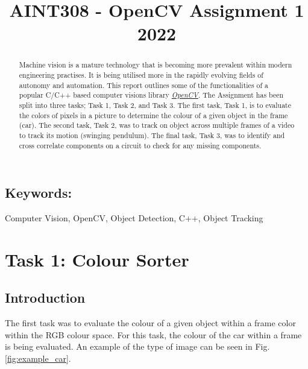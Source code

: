 \documentclass[conference]{IEEEtran}
\begin{document}
\title{AINT308 - OpenCV Assignment 1 2022}

\author{
}

\maketitle

\begin{abstract}

Machine vision is a mature technology that is becoming more prevalent within modern engineering practises. It is being utilised more in the rapidly evolving fields of autonomy and automation. This report outlines some of the functionalities of a popular C/C++ based computer visions library \href{https://opencv.org}{\textit{OpenCV}}. The Assignment has been split into three tasks; Task 1, Task 2, and Task 3. The first task, Task 1, is to evaluate the colors of pixels in a picture to determine the colour of a given object in the frame (car). The second task, Task 2, was to track on object across multiple frames of a video to track its motion (swinging pendulum). The final task, Task 3, was to identify and cross correlate components on a circuit to check for any missing components.

\end{abstract}

\subsection*{Keywords:} 
Computer Vision, OpenCV, Object Detection, C++, Object Tracking

\section{Task 1: Colour Sorter}	
\subsection{Introduction}
The first task was to evaluate the colour of a given object within a frame color within the RGB colour space. For this task, the colour of the car within a frame is being evaluated. An example of the type of image can be seen in Fig. \ref{fig:example_car}.
\end{document}
